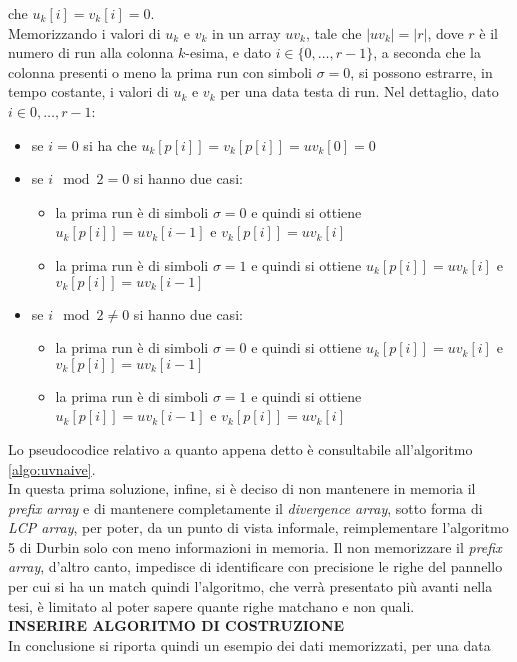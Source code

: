 che $u_k[i]=v_k[i]=0$.\\
Memorizzando i valori di $u_k$ e $v_k$ in un array $uv_k$, tale che
$|uv_k|=|r|$, dove $r$ è il numero di run alla colonna $k$-esima, e dato
$i\in\{0,\ldots, r-1\}$, a seconda che la colonna presenti o meno la prima run
con simboli $\sigma=0$, si possono estrarre, in tempo costante, i valori di
$u_k$ e $v_k$ per una data testa di run. Nel dettaglio, dato $i\in{0,\ldots,
  r-1}$:
\begin{itemize}
  \item se $i=0$ si ha che $u_k[p[i]]=v_k[p[i]]=uv_k[0]=0$
  \item se $i\mod 2 =0$ si hanno due casi:
  \begin{itemize}
    \item la prima run è di simboli $\sigma=0$ e quindi si ottiene
    $u_k[p[i]]=uv_k[i-1]$ e $v_k[p[i]]=uv_k[i]$
    \item la prima run è di simboli $\sigma=1$ e quindi si ottiene
    $u_k[p[i]]=uv_k[i]$ e $v_k[p[i]]=uv_k[i-1]$
  \end{itemize}
  \item se $i\mod 2 \neq 0$ si hanno due casi:
  \begin{itemize}
    \item la prima run è di simboli $\sigma=0$ e quindi si ottiene
    $u_k[p[i]]=uv_k[i]$ e $v_k[p[i]]=uv_k[i-1]$
    \item la prima run è di simboli $\sigma=1$ e quindi si ottiene
    $u_k[p[i]]=uv_k[i-1]$ e $v_k[p[i]]=uv_k[i]$   
  \end{itemize}
\end{itemize}
Lo pseudocodice relativo a quanto appena detto è consultabile all'algoritmo
\ref{algo:uvnaive}.\\
In questa prima soluzione, infine, si è deciso di non mantenere in memoria il
\textit{prefix array} e di mantenere completamente il \textit{divergence
  array}, sotto forma di \textit{LCP array}, per poter, da un punto di vista
informale, reimplementare l'algoritmo 
5 di Durbin solo con meno informazioni in memoria. Il non memorizzare il
\textit{prefix array}, d'altro canto, impedisce di identificare con precisione
le righe del pannello per cui si ha un match quindi l'algoritmo, che verrà
presentato più avanti nella tesi, è limitato al poter sapere quante righe
matchano e non quali.\\
\textbf{INSERIRE ALGORITMO DI COSTRUZIONE}\\
In conclusione si riporta quindi un esempio dei dati memorizzati, per una data
